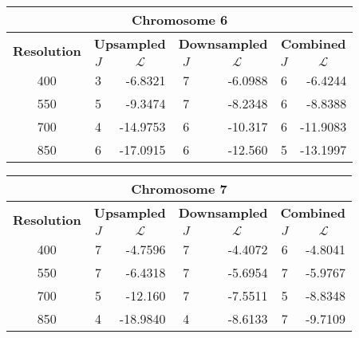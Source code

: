 \begin{table}[h!]
  \centering
\begin{tabular}{|c|c|r|c|r|c|r|}\hline
\multicolumn{7}{|c|}{\textbf{Chromosome 6}} \\ \hline
\multirow{2}{*}{\textbf{Resolution}} & \multicolumn{2}{|c|}{\textbf{Upsampled}} &  \multicolumn{2}{|c|}{\textbf{Downsampled}} &  \multicolumn{2}{|c|}{\textbf{Combined}} \\ \cline{2-7}
    & $J$ & \multicolumn{1}{|c|}{\textbf{$\mathcal{L}$}} & $J$ & \multicolumn{1}{|c|}{\textbf{$\mathcal{L}$}} &$J$ & \multicolumn{1}{|c|}{\textbf{$\mathcal{L}$}}   \\ \hline
400 & 3 & -6.8321 & 7 & -6.0988 & 6 & -6.4244  \\ \hline
550 & 5 & -9.3474 & 7 & -8.2348 & 6 & -8.8388  \\ \hline
700 & 4 & -14.9753 & 6 & -10.317 & 6 & -11.9083  \\ \hline
850 & 6 & -17.0915 & 6 & -12.560 & 5 & -13.1997  \\ \hline
\end{tabular}
\end{table}



\begin{table}[h!]
  \centering
\begin{tabular}{|c|c|r|c|r|c|r|}\hline
\multicolumn{7}{|c|}{\textbf{Chromosome 7}} \\ \hline
\multirow{2}{*}{\textbf{Resolution}} & \multicolumn{2}{|c|}{\textbf{Upsampled}} &  \multicolumn{2}{|c|}{\textbf{Downsampled}} &  \multicolumn{2}{|c|}{\textbf{Combined}} \\ \cline{2-7}
    & $J$ & \multicolumn{1}{|c|}{\textbf{$\mathcal{L}$}} & $J$ & \multicolumn{1}{|c|}{\textbf{$\mathcal{L}$}} &$J$ & \multicolumn{1}{|c|}{\textbf{$\mathcal{L}$}}   \\ \hline
400 & 7 & -4.7596 & 7 & -4.4072 & 6 & -4.8041  \\ \hline
550 & 7 & -6.4318 & 7 & -5.6954 & 7 & -5.9767  \\ \hline
700 & 5 & -12.160 & 7 & -7.5511 & 5 & -8.8348  \\ \hline
850 & 4 & -18.9840 & 4 & -8.6133 & 7 & -9.7109  \\ \hline
\end{tabular}
\end{table}

